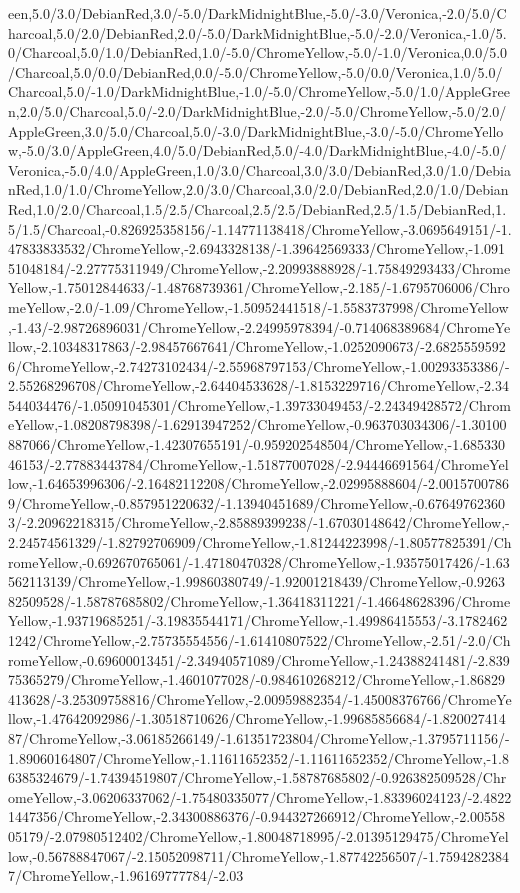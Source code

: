 {\begin{tikzternal}
een,5.0/3.0/DebianRed,3.0/-5.0/DarkMidnightBlue,-5.0/-3.0/Veronica,-2.0/5.0/Charcoal,5.0/2.0/DebianRed,2.0/-5.0/DarkMidnightBlue,-5.0/-2.0/Veronica,-1.0/5.0/Charcoal,5.0/1.0/DebianRed,1.0/-5.0/ChromeYellow,-5.0/-1.0/Veronica,0.0/5.0/Charcoal,5.0/0.0/DebianRed,0.0/-5.0/ChromeYellow,-5.0/0.0/Veronica,1.0/5.0/Charcoal,5.0/-1.0/DarkMidnightBlue,-1.0/-5.0/ChromeYellow,-5.0/1.0/AppleGreen,2.0/5.0/Charcoal,5.0/-2.0/DarkMidnightBlue,-2.0/-5.0/ChromeYellow,-5.0/2.0/AppleGreen,3.0/5.0/Charcoal,5.0/-3.0/DarkMidnightBlue,-3.0/-5.0/ChromeYellow,-5.0/3.0/AppleGreen,4.0/5.0/DebianRed,5.0/-4.0/DarkMidnightBlue,-4.0/-5.0/Veronica,-5.0/4.0/AppleGreen,1.0/3.0/Charcoal,3.0/3.0/DebianRed,3.0/1.0/DebianRed,1.0/1.0/ChromeYellow,2.0/3.0/Charcoal,3.0/2.0/DebianRed,2.0/1.0/DebianRed,1.0/2.0/Charcoal,1.5/2.5/Charcoal,2.5/2.5/DebianRed,2.5/1.5/DebianRed,1.5/1.5/Charcoal,-0.826925358156/-1.14771138418/ChromeYellow,-3.0695649151/-1.47833833532/ChromeYellow,-2.6943328138/-1.39642569333/ChromeYellow,-1.09151048184/-2.27775311949/ChromeYellow,-2.20993888928/-1.75849293433/ChromeYellow,-1.75012844633/-1.48768739361/ChromeYellow,-2.185/-1.6795706006/ChromeYellow,-2.0/-1.09/ChromeYellow,-1.50952441518/-1.5583737998/ChromeYellow,-1.43/-2.98726896031/ChromeYellow,-2.24995978394/-0.714068389684/ChromeYellow,-2.10348317863/-2.98457667641/ChromeYellow,-1.0252090673/-2.68255595926/ChromeYellow,-2.74273102434/-2.55968797153/ChromeYellow,-1.00293353386/-2.55268296708/ChromeYellow,-2.64404533628/-1.8153229716/ChromeYellow,-2.34544034476/-1.05091045301/ChromeYellow,-1.39733049453/-2.24349428572/ChromeYellow,-1.08208798398/-1.62913947252/ChromeYellow,-0.963703034306/-1.30100887066/ChromeYellow,-1.42307655191/-0.959202548504/ChromeYellow,-1.68533046153/-2.77883443784/ChromeYellow,-1.51877007028/-2.94446691564/ChromeYellow,-1.64653996306/-2.16482112208/ChromeYellow,-2.02995888604/-2.00157007869/ChromeYellow,-0.857951220632/-1.13940451689/ChromeYellow,-0.676497623603/-2.20962218315/ChromeYellow,-2.85889399238/-1.67030148642/ChromeYellow,-2.24574561329/-1.82792706909/ChromeYellow,-1.81244223998/-1.80577825391/ChromeYellow,-0.692670765061/-1.47180470328/ChromeYellow,-1.93575017426/-1.63562113139/ChromeYellow,-1.99860380749/-1.92001218439/ChromeYellow,-0.926382509528/-1.58787685802/ChromeYellow,-1.36418311221/-1.46648628396/ChromeYellow,-1.93719685251/-3.19835544171/ChromeYellow,-1.49986415553/-3.17824621242/ChromeYellow,-2.75735554556/-1.61410807522/ChromeYellow,-2.51/-2.0/ChromeYellow,-0.69600013451/-2.34940571089/ChromeYellow,-1.24388241481/-2.83975365279/ChromeYellow,-1.4601077028/-0.984610268212/ChromeYellow,-1.86829413628/-3.25309758816/ChromeYellow,-2.00959882354/-1.45008376766/ChromeYellow,-1.47642092986/-1.30518710626/ChromeYellow,-1.99685856684/-1.82002741487/ChromeYellow,-3.06185266149/-1.61351723804/ChromeYellow,-1.3795711156/-1.89060164807/ChromeYellow,-1.11611652352/-1.11611652352/ChromeYellow,-1.86385324679/-1.74394519807/ChromeYellow,-1.58787685802/-0.926382509528/ChromeYellow,-3.06206337062/-1.75480335077/ChromeYellow,-1.83396024123/-2.48221447356/ChromeYellow,-2.34300886376/-0.944327266912/ChromeYellow,-2.0055805179/-2.07980512402/ChromeYellow,-1.80048718995/-2.01395129475/ChromeYellow,-0.56788847067/-2.15052098711/ChromeYellow,-1.87742256507/-1.75942823847/ChromeYellow,-1.96169777784/-2.03
\end{tikzternal}}
